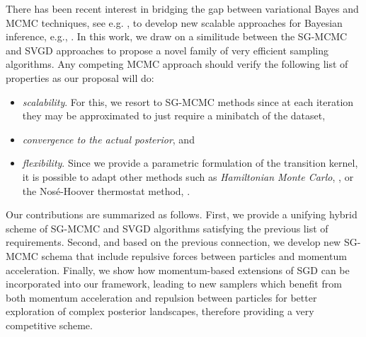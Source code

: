 There has been recent interest in bridging the gap between variational Bayes and MCMC techniques, see e.g. \cite{zhang2018}, to develop new scalable approaches for Bayesian inference, e.g., \cite{carbonetto2012}.
In this work, we draw on a similitude between the SG-MCMC and SVGD approaches to propose a novel family of very efficient sampling algorithms. 
Any competing MCMC approach should verify the following list of properties as our proposal will do:
\begin{itemize}
    \item \emph{scalability}. For this, we resort to SG-MCMC methods since at each iteration they may be approximated to just require a minibatch of the dataset,
    \item \emph{convergence to the actual posterior}, and
    \item \emph{flexibility}. Since we provide a parametric formulation of the transition kernel, it is possible to adapt other methods such as \emph{Hamiltonian Monte Carlo}, \cite{neal2011mcmc}, or the Nos\'e-Hoover thermostat method, \cite{ding2014bayesian}.
\end{itemize}

Our contributions are summarized as follows. First, we provide a unifying hybrid scheme of SG-MCMC and SVGD algorithms satisfying the previous list of requirements. Second, and based on the previous connection, 
we develop new SG-MCMC schema that include repulsive forces between particles and momentum acceleration. Finally, we show how momentum-based extensions of SGD can be incorporated into our framework, leading to new samplers which benefit from both momentum acceleration and repulsion between particles for better exploration of complex posterior landscapes, therefore providing a very competitive scheme. 

